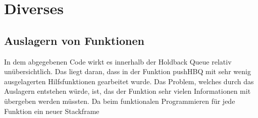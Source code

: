 \section{Diverses}

\subsection{Auslagern von Funktionen}

In dem abgegebenen Code wirkt es innerhalb der Holdback Queue relativ unübersichtlich. Das liegt daran, dass in der Funktion pushHBQ mit sehr wenig ausgelagerten Hilfsfunktionen gearbeitet wurde. 
Das Problem, welches durch das Auslagern entstehen würde, ist, das der Funktion sehr vielen Informationen mit übergeben werden müssten. 
Da beim funktionalen Programmieren für jede Funktion ein neuer Stackframe 



